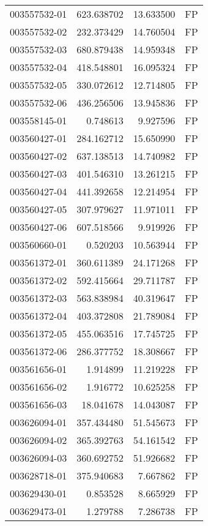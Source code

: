 \begin{tabular}{lrrl}
003557532-01 &  623.638702 &    13.633500 &   FP \\
003557532-02 &  232.373429 &    14.760504 &   FP \\
003557532-03 &  680.879438 &    14.959348 &   FP \\
003557532-04 &  418.548801 &    16.095324 &   FP \\
003557532-05 &  330.072612 &    12.714805 &   FP \\
003557532-06 &  436.256506 &    13.945836 &   FP \\
003558145-01 &    0.748613 &     9.927596 &   FP \\
003560427-01 &  284.162712 &    15.650990 &   FP \\
003560427-02 &  637.138513 &    14.740982 &   FP \\
003560427-03 &  401.546310 &    13.261215 &   FP \\
003560427-04 &  441.392658 &    12.214954 &   FP \\
003560427-05 &  307.979627 &    11.971011 &   FP \\
003560427-06 &  607.518566 &     9.919926 &   FP \\
003560660-01 &    0.520203 &    10.563944 &   FP \\
003561372-01 &  360.611389 &    24.171268 &   FP \\
003561372-02 &  592.415664 &    29.711787 &   FP \\
003561372-03 &  563.838984 &    40.319647 &   FP \\
003561372-04 &  403.372808 &    21.789084 &   FP \\
003561372-05 &  455.063516 &    17.745725 &   FP \\
003561372-06 &  286.377752 &    18.308667 &   FP \\
003561656-01 &    1.914899 &    11.219228 &   FP \\
003561656-02 &    1.916772 &    10.625258 &   FP \\
003561656-03 &   18.041678 &    14.043087 &   FP \\
003626094-01 &  357.434480 &    51.545673 &   FP \\
003626094-02 &  365.392763 &    54.161542 &   FP \\
003626094-03 &  360.692752 &    51.926682 &   FP \\
003628718-01 &  375.940683 &     7.667862 &   FP \\
003629430-01 &    0.853528 &     8.665929 &   FP \\
003629473-01 &    1.279788 &     7.286738 &   FP \\

\end{tabular}

